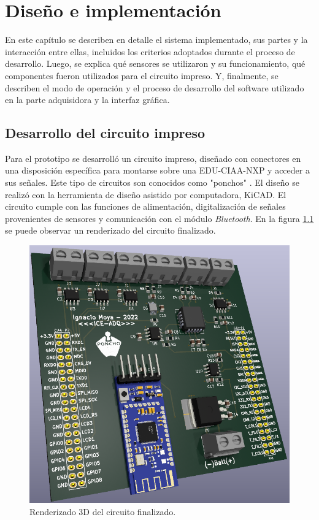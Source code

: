 \chapter{Diseño e implementación} %

\label{Chapter3}

En este capítulo se describen en detalle el sistema implementado, sus partes y la interacción entre ellas, incluidos los criterios adoptados durante el proceso de desarrollo. Luego, se explica qué sensores se utilizaron y su funcionamiento, qué componentes fueron utilizados para el circuito impreso. Y, finalmente, se describen el modo de operación y el proceso de desarrollo del software utilizado en la parte adquisidora y la interfaz gráfica.

\section{Desarrollo del circuito impreso} \label{circuito}

Para el prototipo se desarrolló un circuito impreso, diseñado con conectores en una disposición específica para montarse sobre una EDU-CIAA-NXP y acceder a sus señales. Este tipo de circuitos son conocidos como "ponchos" \cite{poncho}. El diseño se realizó con la herramienta de diseño asistido por computadora, KiCAD. El circuito cumple con las funciones de alimentación, digitalización de señales provenientes de sensores y comunicación con el módulo \textit{Bluetooth}. En la figura \ref{fig:circuito-3d} se puede observar un renderizado del circuito finalizado. 

\begin{figure}[t]
\centering
\includegraphics[width=.8\textwidth]{./Figures/circuito-3d.png}
\caption{Renderizado 3D del circuito finalizado.}
\label{fig:circuito-3d}
\end{figure}


